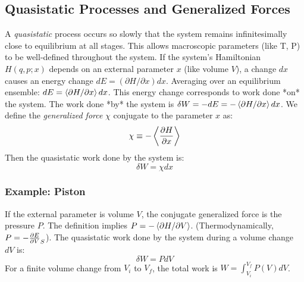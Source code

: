 \documentclass[10pt, letterpaper]{article}
\newcommand{\avg}[1]{\expval{#1}} %
\begin{document}
\subsection{Quasistatic Processes and Generalized Forces}
A \textit{quasistatic} process occurs so slowly that the system remains infinitesimally close to equilibrium at all stages. This allows macroscopic parameters (like T, P) to be well-defined throughout the system.
If the system's Hamiltonian $H(q, p; x)$ depends on an external parameter $x$ (like volume $V$), a change $dx$ causes an energy change $dE = (\partial H / \partial x) dx$. Averaging over an equilibrium ensemble: $dE = \avg{\partial H / \partial x} dx$.
This energy change corresponds to work done *on* the system. The work done *by* the system is $\delta W = -dE = -\avg{\partial H / \partial x} dx$.
We define the \textit{generalized force} $\chi$ conjugate to the parameter $x$ as:
\begin{equation}
    \chi \equiv -\avg{\frac{\partial H}{\partial x}}
\end{equation}
Then the quasistatic work done by the system is:
\begin{equation}
    \delta W = \chi dx
\end{equation}

\subsubsection*{Example: Piston}
If the external parameter is volume $V$, the conjugate generalized force is the pressure $P$. The definition implies $P = -\avg{\partial H / \partial V}$. (Thermodynamically, $P = -\pdv{E}{V}_S$).
The quasistatic work done by the system during a volume change $dV$ is:
\begin{equation*}
    \delta W = P dV
\end{equation*}
For a finite volume change from $V_i$ to $V_f$, the total work is $W = \int_{V_i}^{V_f} P(V) dV$.
\end{document}
